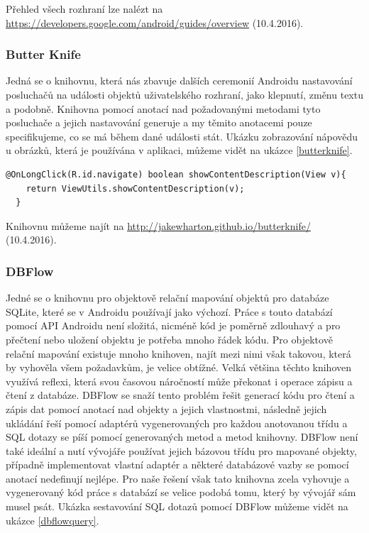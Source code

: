 \documentclass[czech,master,public,dept460,male,java,cpdeclaration]{diploma}
\begin{document}
Přehled všech rozhraní lze nalézt na \url{https://developers.google.com/android/guides/overview} (10.4.2016).

\subsubsection{Butter Knife}
Jedná se o knihovnu, která nás zbavuje dalších ceremonií Androidu nastavování posluchačů
na události objektů uživatelského rozhraní, jako klepnutí, změnu textu a podobně. Knihovna pomocí
anotací nad požadovanými metodami tyto posluchače a jejich nastavování generuje a my těmito anotacemi
pouze specifikujeme, co se má během dané události stát. Ukázku zobrazování nápovědu u obrázků, která je
používána v aplikaci, můžeme vidět na ukázce \ref{butterknife}.

\begin{lstlisting}[label=butterknife,caption=Použití knihovny Butter Knife]
  @OnLongClick(R.id.navigate) boolean showContentDescription(View v){
    return ViewUtils.showContentDescription(v);
  }

\end{lstlisting}

Knihovnu můžeme najít na \url{http://jakewharton.github.io/butterknife/} (10.4.2016).

\subsubsection{DBFlow}\label{dbflow}
Jedné se o knihovnu pro objektově relační mapování objektů pro databáze SQLite, které se v
 Androidu používají jako výchozí. Práce s touto databází pomocí API Androidu není
 složitá, nicméně kód je poměrně zdlouhavý a pro přečtení nebo uložení objektu je potřeba
 mnoho řádek kódu. Pro objektově relační mapování existuje mnoho knihoven, najít mezi nimi však takovou,
 která by vyhověla všem požadavkům, je velice obtížné. Velká většina těchto knihoven využívá reflexi,
 která svou časovou náročností může překonat i operace zápisu a čtení z databáze.
 DBFlow se snaží tento problém řešit generací kódu pro čtení a zápis dat pomocí anotací nad objekty
 a jejich vlastnostmi, následně jejich ukládání řeší pomocí adaptérů vygenerovaných pro každou anotovanou
 třídu a SQL dotazy se píší pomocí generovaných metod a metod knihovny. DBFlow není také ideální
  a nutí vývojáře používat jejich bázovou třídu pro mapované objekty, případně implementovat vlastní
  adaptér a některé databázové vazby se pomocí anotací nedefinují nejlépe. Pro naše řešení však tato
  knihovna zcela vyhovuje a vygenerovaný kód práce s databází se velice podobá tomu, který by vývojář
  sám musel psát. Ukázka sestavování SQL dotazů pomocí DBFlow můžeme vidět na ukázce \ref{dbflowquery}.
\end{document}

